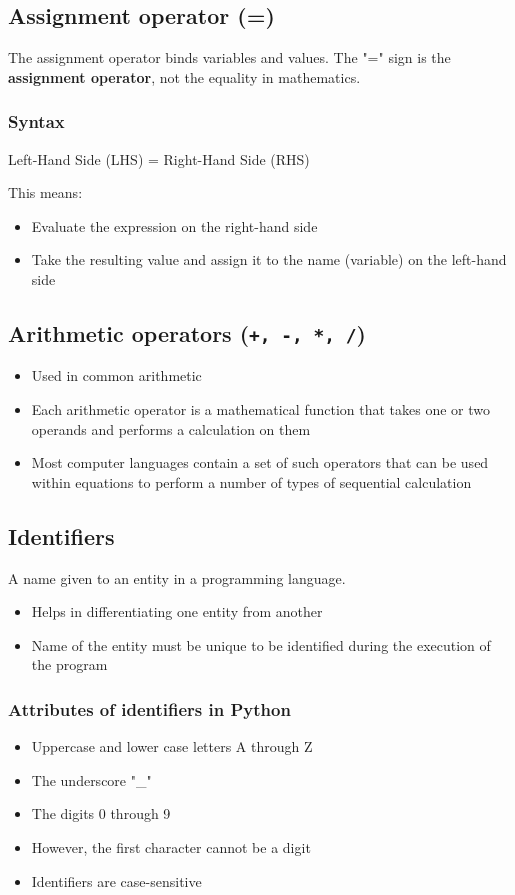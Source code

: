 \documentclass[11pt]{article}
\begin{document}
\subsection{Assignment operator (=)}
\label{sec:orga0b8121}
The assignment operator binds variables and values. The "=" sign is the \textbf{assignment operator}, not the equality in mathematics.

\subsubsection{Syntax}
\label{sec:orgbbfe316}
Left-Hand Side (LHS) = Right-Hand Side (RHS)

This means:
\begin{itemize}
\item Evaluate the expression on the right-hand side
\item Take the resulting value and assign it to the name (variable) on the left-hand side
\end{itemize}

\subsection{Arithmetic operators (\texttt{+, -, *, /})}
\label{sec:org3364782}
\begin{itemize}
\item Used in common arithmetic
\item Each arithmetic operator is a mathematical function that takes one or two operands and performs a calculation on them
\item Most computer languages contain a set of such operators that can be used within equations to perform a number of types of sequential calculation
\end{itemize}

\subsection{Identifiers}
\label{sec:org71c10c6}
A name given to an entity in a programming language.
\begin{itemize}
\item Helps in differentiating one entity from another
\item Name of the entity must be unique to be identified during the execution of the program
\end{itemize}

\subsubsection{Attributes of identifiers in Python}
\label{sec:org179a349}
\label{org72b2d39}
\begin{itemize}
\item Uppercase and lower case letters A through Z
\item The underscore "\_"
\item The digits 0 through 9
\item However, the first character cannot be a digit
\item Identifiers are case-sensitive
\end{itemize}
\end{document}

